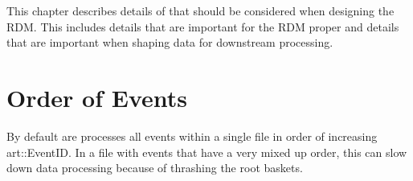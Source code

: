 This chapter describes details of \art that should be considered when
designing the RDM.  This includes details that are important for the RDM
proper and details that are important when shaping data for downstream
processing.

\section{Order of Events}

By default are processes all events within a single file in order of
increasing {\code art::EventID}.
In a file with events that have a very mixed up order, this can slow down
data processing because of thrashing the root baskets.  


\clearpage
{}
{}
\printbibliography


